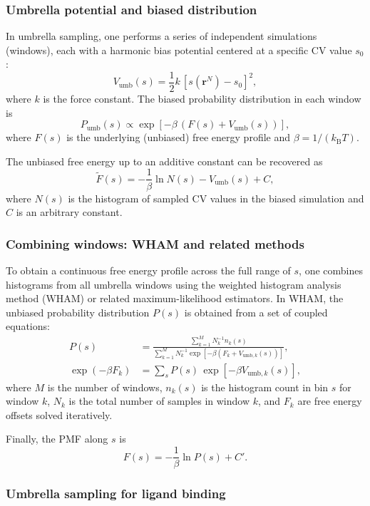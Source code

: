 \documentclass[12pt,a4paper]{article}
\begin{document}
\subsubsection{Umbrella potential and biased distribution}

In umbrella sampling, one performs a series of independent simulations (windows), each with a harmonic bias potential centered at a specific CV value \(s_0\):
\[
V_{\text{umb}}(s) = \frac{1}{2}k\,[s(\mathbf{r}^N) - s_0]^2,
\]
where \(k\) is the force constant.\cite{Kastner2011} The biased probability distribution in each window is
\[
P_{\text{umb}}(s) \propto \exp\left[-\beta\,(F(s) + V_{\text{umb}}(s))\right],
\]
where \(F(s)\) is the underlying (unbiased) free energy profile and \(\beta = 1/(k_{\mathrm{B}}T)\).

The unbiased free energy up to an additive constant can be recovered as
\[
\tilde{F}(s) = -\frac{1}{\beta}\ln N(s) - V_{\text{umb}}(s) + C,
\]
where \(N(s)\) is the histogram of sampled CV values in the biased simulation and \(C\) is an arbitrary constant.\cite{Kastner2011}

\subsubsection{Combining windows: WHAM and related methods}

To obtain a continuous free energy profile across the full range of \(s\), one combines histograms from all umbrella windows using the weighted histogram analysis method (WHAM) or related maximum-likelihood estimators.\cite{Kumar1992,Roux1995} In WHAM, the unbiased probability distribution \(P(s)\) is obtained from a set of coupled equations:
\begin{align}
P(s) &= \frac{\sum_{k=1}^{M} N_k^{-1} n_k(s)}{\sum_{k=1}^{M} N_k^{-1} \exp\left[-\beta \left(F_k + V_{\text{umb},k}(s)\right)\right]}, \\
\exp(-\beta F_k) &= \sum_{s} P(s)\,\exp\left[-\beta V_{\text{umb},k}(s)\right],
\end{align}
where \(M\) is the number of windows, \(n_k(s)\) is the histogram count in bin \(s\) for window \(k\), \(N_k\) is the total number of samples in window \(k\), and \(F_k\) are free energy offsets solved iteratively.

Finally, the PMF along \(s\) is
\[
F(s) = -\frac{1}{\beta}\ln P(s) + C'.
\]

\subsubsection{Umbrella sampling for ligand binding}
\end{document}
